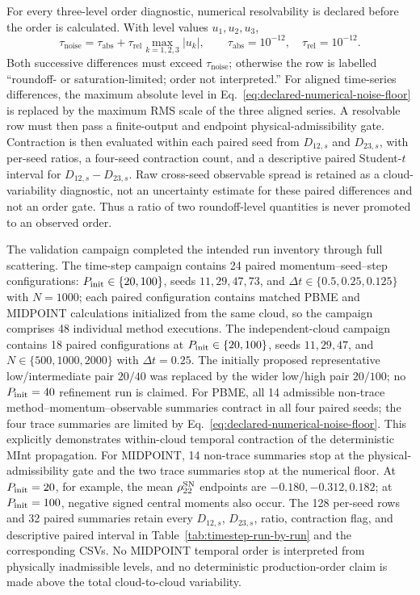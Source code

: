 \documentclass[
  11pt,
  letterpaper,
  onehalfspacing,
  normalmargins,
  equalmargins,
  oneside
]{ut-thesis}
\begin{document}
For every three-level order diagnostic, numerical resolvability is declared
before the order is calculated. With level values \(u_1,u_2,u_3\),
\begin{equation}
\tau_{\mathrm{noise}}
=\tau_{\mathrm{abs}}
+\tau_{\mathrm{rel}}\max_{k=1,2,3}|u_k|,
\qquad
\tau_{\mathrm{abs}}=10^{-12},\quad
\tau_{\mathrm{rel}}=10^{-12}.
\label{eq:declared-numerical-noise-floor}
\end{equation}
Both successive differences must exceed \(\tau_{\mathrm{noise}}\); otherwise
the row is labelled ``roundoff- or saturation-limited; order not
interpreted.'' For aligned time-series differences, the maximum absolute
level in Eq.~\eqref{eq:declared-numerical-noise-floor} is replaced by the
maximum RMS scale of the three aligned series. A resolvable row must then
pass a finite-output and endpoint physical-admissibility gate. Contraction is
then evaluated within each paired seed from \(D_{12,s}\) and \(D_{23,s}\), with
per-seed ratios, a four-seed contraction count, and a descriptive paired
Student-\(t\) interval for \(D_{12,s}-D_{23,s}\). Raw cross-seed observable
spread is retained as a cloud-variability diagnostic, not an uncertainty
estimate for these paired differences and not an order gate. Thus a ratio of
two roundoff-level quantities is never promoted to an observed order.

The validation campaign completed the intended run inventory through
full scattering. The time-step campaign contains 24 paired
momentum--seed--step configurations: \(P_{\rm init}\in\{20,100\}\), seeds
\(11,29,47,73\), and \(\Delta t\in\{0.5,0.25,0.125\}\) with \(N=1000\); each
paired configuration contains matched PBME and MIDPOINT calculations
initialized from the same cloud, so the campaign comprises 48 individual
method executions. The independent-cloud campaign contains 18 paired
configurations at \(P_{\rm init}\in\{20,100\}\), seeds \(11,29,47\), and
\(N\in\{500,1000,2000\}\) with \(\Delta t=0.25\).
The initially proposed representative low/intermediate pair \(20/40\) was
replaced by the wider low/high pair \(20/100\); no \(P_{\rm init}=40\) refinement run
is claimed.
For PBME, all 14 admissible non-trace method--momentum--observable summaries
contract in all four paired seeds; the four trace summaries are limited by
Eq.~\eqref{eq:declared-numerical-noise-floor}. This explicitly demonstrates
within-cloud temporal contraction of the deterministic MInt propagation. For
MIDPOINT, 14 non-trace summaries stop at the physical-admissibility gate and
the two trace summaries stop at the numerical floor. At
\(P_{\rm init}=20\), for example, the mean \(\rho_{22}^{\rm SN}\) endpoints
are \(-0.180,-0.312,0.182\); at \(P_{\rm init}=100\), negative signed central
moments also occur. The 128 per-seed rows and 32 paired summaries retain every
\(D_{12,s}\), \(D_{23,s}\), ratio, contraction flag, and descriptive paired
interval in Table~\ref{tab:timestep-run-by-run} and the corresponding CSVs.
No MIDPOINT temporal order is interpreted from physically inadmissible levels,
and no deterministic production-order claim is made above the total
cloud-to-cloud variability.
\end{document}
